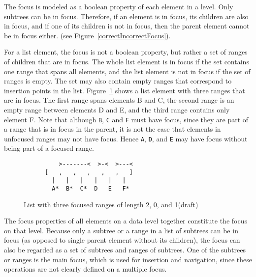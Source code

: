The focus is modeled as a boolean property of each element in a level. Only subtrees can be in focus. Therefore, if an element is in focus, its children are also in focus, and if one of its children is not in focus, then the parent element cannot be in focus either. (see Figure~\ref{correctIncorrectFocus}). 

For a list element, the focus is not a boolean property, but rather a set of ranges of children that are in focus. The whole list element is in focus if the set contains one range that spans all elements, and the list element is not in focus if the set of ranges is empty. The set may also contain empty ranges that correspond to insertion points in the list. Figure~\ref{listFocus} shows a list element with three ranges that are in focus. The first range spans elements B and C, the second range is an empty range between elements D and E, and the third range contains only element F. Note that although \verb|B|, \verb|C| and \verb|F| must have focus, since they are part of a range that is in focus in the parent, it is not the case that elements in unfocused ranges may not have focus. Hence \verb|A|, \verb|D|, and \verb|E| may have focus without being part of a focused range.

\begin{figure}
\begin{small}
\begin{center}
\begin{verbatim}
          >-------<  >-<  >---<          
      [   ,   ,   ,   ,   ,   ]
        |   |   |   |   |   |
        A*  B*  C*  D   E   F*

\end{verbatim}
\caption{List with three focused ranges of length 2, 0, and 1(draft)}\label{listFocus} 
\end{center}
\end{small}
\end{figure}


The focus properties of all elements on a data level together constitute the focus on that level. Because only a subtree or a range in a list of subtrees can be in focus (as opposed to single parent element without its children), the focus can also be regarded as a set of subtrees and ranges of subtrees. One of the subtrees or ranges is the main focus, which is used for insertion and navigation, since these operations are not clearly defined on a multiple focus. 

